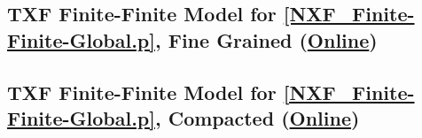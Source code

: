 \documentclass{easychair}
\begin{document}
\newpage
\subsection{TXF Finite-Finite Model for \ref{NXF_Finite-Finite-Global.p}, Fine Grained
(\href{https://raw.githubusercontent.com/GeoffsPapers/InterpretationFormat/master/Examples/NXF_Finite-Finite-Global_Fine.s}{Online})}
\label{NXF_Finite-Finite-Global_Fine.s}
\begin{small}

\end{small}

\newpage
\subsection{TXF Finite-Finite Model for \ref{NXF_Finite-Finite-Global.p}, Compacted
(\href{https://raw.githubusercontent.com/GeoffsPapers/InterpretationFormat/master/Examples/NXF_Finite-Finite-Global_Compact.s}{Online})}
\label{NXF_Finite-Finite-Global_Compact.s}
\begin{small}

\end{small}

\end{document}
